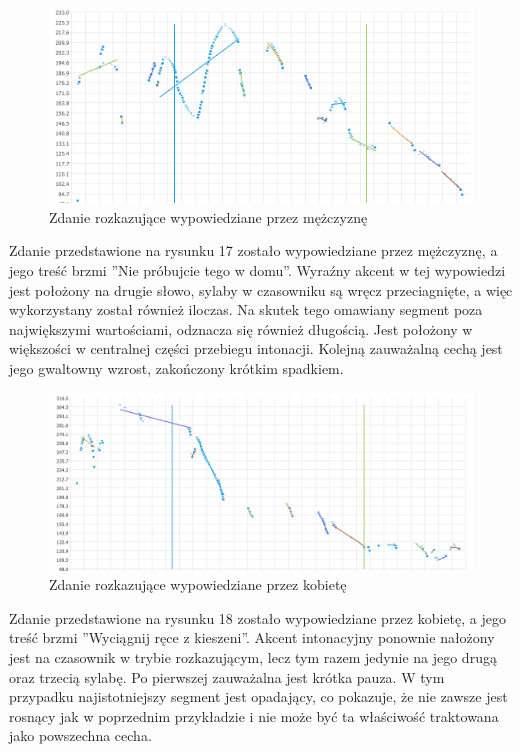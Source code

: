 \documentclass[a4paper,12 pt]{article}
\begin{document}
 \FloatBarrier
\begin{figure}[h]
\centering
\includegraphics[scale=0.7]{rozkaz_dom.png}
\caption{Zdanie rozkazujące wypowiedziane przez mężczyznę}
\end{figure}
\FloatBarrier
Zdanie przedstawione na rysunku 17 zostało wypowiedziane przez mężczyznę, a jego treść brzmi ''Nie próbujcie tego w domu''. Wyraźny akcent w tej wypowiedzi jest położony na drugie słowo, sylaby w czasowniku są wręcz przeciagnięte, a więc wykorzystany został również iloczas. Na skutek tego omawiany segment poza największymi wartościami, odznacza się również długością. Jest położony w większości w centralnej części przebiegu intonacji. Kolejną zauważalną cechą jest jego gwaltowny wzrost, zakończony krótkim spadkiem. 
 \FloatBarrier
\begin{figure}[h]
\centering
\includegraphics[scale=0.7]{rozkaz_rece_kobieta.png}
\caption{Zdanie rozkazujące wypowiedziane przez kobietę}
\end{figure}
\FloatBarrier
Zdanie przedstawione na rysunku 18 zostało wypowiedziane przez kobietę, a jego treść brzmi ''Wyciągnij ręce z kieszeni''. Akcent intonacyjny ponownie nałożony jest na czasownik w trybie rozkazującym, lecz tym razem jedynie na jego drugą oraz trzecią sylabę. Po pierwszej zauważalna jest krótka pauza.
W tym przypadku najistotniejszy segment jest opadający, co pokazuje, że nie zawsze jest rosnący jak w poprzednim przykładzie i nie może być ta właściwość traktowana jako powszechna cecha.
\end{document}
